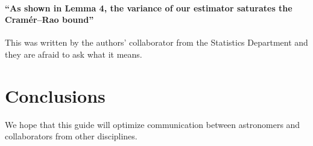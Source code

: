 \documentclass[12pt, preprint]{aastex}
\begin{document}
\paragraph{``As shown in Lemma 4, the variance of our estimator saturates
the Cram\'er--Rao bound''}
This was written by the authors' collaborator from the Statistics Department
and they are afraid to ask what it means.


\section{Conclusions}

We hope that this guide will optimize communication between astronomers
and collaborators from other disciplines.
\end{document}
